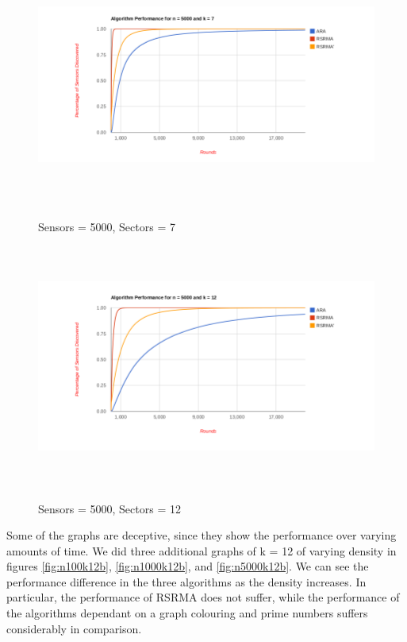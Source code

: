 \begin{figure}[ht]
\caption{Sensors = 5000, Sectors = 7}
\includegraphics[height = 8cm]{pics/graph5000k7.png}\\[0.5cm]   
\label{fig:n5000k7} 
\end{figure}

\begin{figure}[ht]
\caption{Sensors = 5000, Sectors = 12}
\includegraphics[height = 8cm]{pics/graph5000k12.png}\\[0.5cm] 
\label{fig:n5000k12}   
\end{figure}

\newpage

Some of the graphs are deceptive, since they show the performance over varying amounts of time.
We did three additional graphs of k = 12 of varying density in figures \ref{fig:n100k12b}, 
\ref{fig:n1000k12b}, and \ref{fig:n5000k12b}. We can see the performance difference in the three algorithms as the density increases. In particular, the performance of RSRMA does not suffer, while the performance of the algorithms dependant on a graph colouring and prime numbers suffers considerably in comparison.

